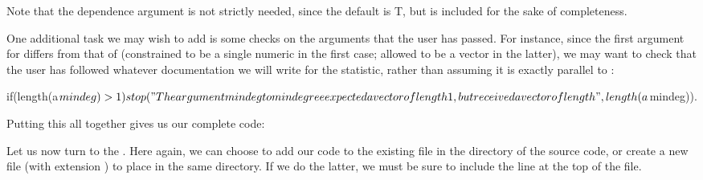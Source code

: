 \documentclass[nojss]{jss}
\begin{document}
Note that the dependence argument is not strictly needed, since the default is T, but is included for the sake of completeness.

One additional task we may wish to add is some checks on the arguments that the user has passed.  For instance, since the first argument for  differs from that of  (constrained to be a single numeric in the first case; allowed to be a vector in the latter), we may want to check that the user has followed whatever documentation we will write for the statistic, rather than assuming it is exactly parallel to :

\begin{CodeChunk}
\begin{CodeInput}
  if(length(a$mindeg) > 1)
    stop("The argument mindeg to mindegree expected a vector of length
          1, but received a vector of length", length(a$mindeg)).
\end{CodeInput}
\end{CodeChunk}

Putting this all together gives us our complete  code:

\begin{CodeChunk}
\end{CodeChunk}

Let us now turn to the . Here again, we can choose to add our code to the existing file  in the  directory of the  source code, or create a new file (with extension ) to place in the same directory. If we do the latter, we must be sure to include the line  at the top of the file.
\end{document}
